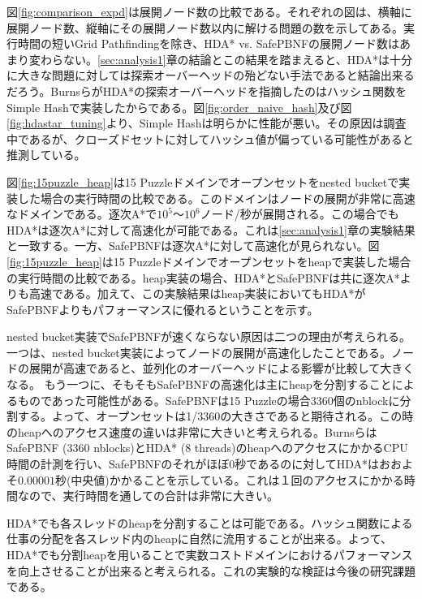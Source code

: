\documentclass[uplatex]{jsarticle}
\begin{document}
図\ref{fig:comparison_expd}は展開ノード数の比較である。それぞれの図は、横軸に展開ノード数、縦軸にその展開ノード数以内に解ける問題の数を示してある。実行時間の短いGrid Pathfindingを除き、HDA* vs. SafePBNFの展開ノード数はあまり変わらない。\ref{sec:analysis1}章の結論とこの結果を踏まえると、HDA*は十分に大きな問題に対しては探索オーバーヘッドの殆どない手法であると結論出来るだろう。BurnsらがHDA*の探索オーバーヘッドを指摘したのはハッシュ関数をSimple Hashで実装したからである。図\ref{fig:order_naive_hash}及び図\ref{fig:hdastar_tuning}より、Simple Hashは明らかに性能が悪い。その原因は調査中であるが、クローズドセットに対してハッシュ値が偏っている可能性があると推測している。 %

図\ref{fig:15puzzle_heap}は15 Puzzleドメインでオープンセットをnested bucketで実装した場合の実行時間の比較である。このドメインはノードの展開が非常に高速なドメインである。逐次A*で$10^5$〜$10^6$ノード/秒が展開される。この場合でもHDA*は逐次A*に対して高速化が可能である。これは\ref{sec:analysis1}章の実験結果と一致する。一方、SafePBNFは逐次A*に対して高速化が見られない。図\ref{fig:15puzzle_heap}は15 Puzzleドメインでオープンセットをheapで実装した場合の実行時間の比較である。heap実装の場合、HDA*とSafePBNFは共に逐次A*よりも高速である。加えて、この実験結果はheap実装においてもHDA*がSafePBNFよりもパフォーマンスに優れるということを示す。

nested bucket実装でSafePBNFが速くならない原因は二つの理由が考えられる。
一つは、nested bucket実装によってノードの展開が高速化したことである。ノードの展開が高速であると、並列化のオーバーヘッドによる影響が比較して大きくなる。 %
もう一つに、そもそもSafePBNFの高速化は主にheapを分割することによるものであった可能性がある。SafePBNFは15 Puzzleの場合3360個のnblockに分割する。よって、オープンセットは1/3360の大きさであると期待される。この時のheapへのアクセス速度の違いは非常に大きいと考えられる。BurnsらはSafePBNF (3360 nblocks)とHDA* (8 threads)のheapへのアクセスにかかるCPU時間の計測を行い、SafePBNFのそれがほぼ0秒であるのに対してHDA*はおおよそ$0.00001$秒(中央値)かかることを示している\cite{Burns2010}。これは１回のアクセスにかかる時間なので、実行時間を通しての合計は非常に大きい。

HDA*でも各スレッドのheapを分割することは可能である。ハッシュ関数による仕事の分配を各スレッド内のheapに自然に流用することが出来る。よって、HDA*でも分割heapを用いることで実数コストドメインにおけるパフォーマンスを向上させることが出来ると考えられる。これの実験的な検証は今後の研究課題である。
\end{document}
